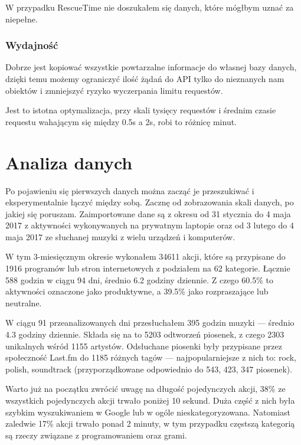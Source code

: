\documentclass[brudnopis]{xmgr}
\begin{document}
        W przypadku RescueTime nie doszukałem się danych, które mógłbym uznać za niepełne.

        \subsection*{Wydajność}
        Dobrze jest kopiować wszystkie powtarzalne informacje do własnej bazy danych,
        dzięki temu możemy ograniczyć ilość żądań do API tylko do nieznanych nam obiektów i zmniejszyć ryzyko wyczerpania limitu requestów.

		Jest to istotna optymalizacja, przy skali tysięcy requestów i średnim czasie requestu wahającym się między 0.5s a 2s,
		robi to różnicę minut.

\chapter{Analiza danych}

	Po pojawieniu się pierwszych danych można zacząć je przeszukiwać i eksperymentalnie łączyć między sobą.
	Zacznę od zobrazowania skali danych, po jakiej się poruszam.
	Zaimportowane dane są z okresu od 31 stycznia do 4 maja 2017 z aktywności wykonywanych na prywatnym laptopie
	oraz od 3 lutego do 4 maja 2017 ze słuchanej muzyki z wielu urządzeń i komputerów.

	W tym 3-miesięcznym okresie wykonałem 34611 akcji, które są przypisane do 1916 programów lub stron internetowych z podziałem na 62 kategorie.
	Łącznie 588 godzin w ciągu 94 dni, średnio 6.2 godziny dziennie.
	Z czego 60.5\% to aktywności oznaczone jako produktywne, a 39.5\% jako rozpraszające lub neutralne.

	W ciągu 91 przeanalizowanych dni przesłuchałem 395 godzin muzyki — średnio 4.3 godziny dziennie.
	Składa się na to 5203 odtworzeń piosenek, z czego 2303 unikalnych wśród 1155 artystów.
	Odsłuchane piosenki były przypisane przez społeczność Last.fm do 1185 różnych tagów — najpopularniejsze z nich to: rock, polish, soundtrack
	(przyporządkowane odpowiednio do 543, 423, 347 piosenek).

	Warto już na początku zwrócić uwagę na długość pojedynczych akcji, 38\% ze wszystkich pojedynczych akcji trwało poniżej 10 sekund. %
	Duża część z nich była szybkim wyszukiwaniem w Google lub w ogóle nieskategoryzowana.
	Natomiast zaledwie 17\% akcji trwało ponad 2 minuty, w tym przypadku częstszą kategorią są rzeczy związane z programowaniem oraz grami.
\end{document}
